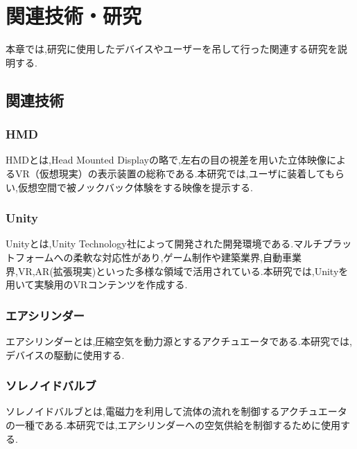 \chapter{関連技術・研究}

本章では,研究に使用したデバイスやユーザーを吊して行った関連する研究を説明する.

\section{関連技術}

\subsection{HMD}

HMDとは,Head Mounted Displayの略で,左右の目の視差を用いた立体映像によるVR（仮想現実）の表示装置の総称である.本研究では,ユーザに装着してもらい,仮想空間で被ノックバック体験をする映像を提示する.


\subsection{Unity}

Unityとは,Unity Technology社によって開発された開発環境である.マルチプラットフォームへの柔軟な対応性があり,ゲーム制作や建築業界,自動車業界,VR,AR(拡張現実)といった多様な領域で活用されている.本研究では,Unityを用いて実験用のVRコンテンツを作成する.

\subsection{エアシリンダー}

エアシリンダーとは,圧縮空気を動力源とするアクチュエータである.本研究では,デバイスの駆動に使用する.

\subsection{ソレノイドバルブ}

ソレノイドバルブとは,電磁力を利用して流体の流れを制御するアクチュエータの一種である.本研究では,エアシリンダーへの空気供給を制御するために使用する.

